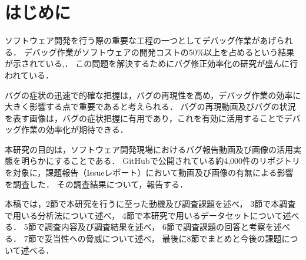 \section{はじめに\label{intro}}
ソフトウェア開発を行う際の重要な工程の一つとしてデバッグ作業があげられる．
デバッグ作業がソフトウェアの開発コストの50\%以上を占めるという結果が示されている\cite{Evaluating_Effectiveness},\cite{Auto_Repair}．
この問題を解決するためにバグ修正効率化の研究が盛んに行われている．

バグの症状の迅速で的確な把握は，バグの再現性を高め，デバッグ作業の効率に大きく影響する点で重要であると考えられる．
バグの再現動画及びバグの状況を表す画像は，バグの症状把握に有用であり，これを有効に活用することでデバッグ作業の効率化が期待できる．

本研究の目的は，ソフトウェア開発現場におけるバグ報告動画及び画像の活用実態を明らかにすることである．
GitHubで公開されている約4,000件のリポジトリを対象に，課題報告（Issueレポート）において動画及び画像の有無による影響を調査した．
その調査結果について，報告する．

本稿では，2節で本研究を行うに至った動機及び調査課題を述べ，
3節で本調査で用いる分析法について述べ，
4節で本研究で用いるデータセットについて述べる．
5節で調査内容及び調査結果を述べ，
6節で調査課題の回答と考察を述べる．
7節で妥当性への脅威について述べ，
最後に8節でまとめと今後の課題について述べる．
